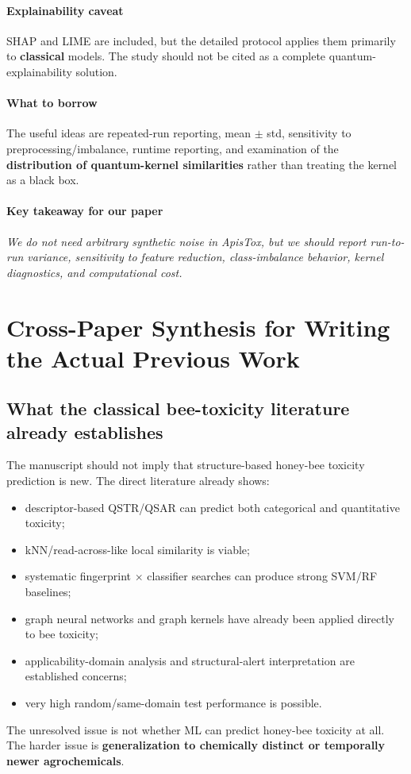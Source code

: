 \documentclass[11pt]{article}
\newcommand{\reviewfield}[2]{\paragraph{#1}#2}
\newcommand{\keytakeaway}[1]{\paragraph{Key takeaway for our paper}\emph{#1}}
\begin{document}
\reviewfield{Explainability caveat}{
SHAP and LIME are included, but the detailed protocol applies them primarily to \textbf{classical} models. The study should not be cited as a complete quantum-explainability solution.
}

\reviewfield{What to borrow}{
The useful ideas are repeated-run reporting, mean $\pm$ std, sensitivity to preprocessing/imbalance, runtime reporting, and examination of the \textbf{distribution of quantum-kernel similarities} rather than treating the kernel as a black box.
}

\keytakeaway{We do not need arbitrary synthetic noise in ApisTox, but we should report run-to-run variance, sensitivity to feature reduction, class-imbalance behavior, kernel diagnostics, and computational cost.}

\newpage
\section{Cross-Paper Synthesis for Writing the Actual Previous Work}

\subsection{What the classical bee-toxicity literature already establishes}

The manuscript should not imply that structure-based honey-bee toxicity prediction is new. The direct literature already shows:
\begin{itemize}
    \item descriptor-based QSTR/QSAR can predict both categorical and quantitative toxicity;
    \item kNN/read-across-like local similarity is viable;
    \item systematic fingerprint $\times$ classifier searches can produce strong SVM/RF baselines;
    \item graph neural networks and graph kernels have already been applied directly to bee toxicity;
    \item applicability-domain analysis and structural-alert interpretation are established concerns;
    \item very high random/same-domain test performance is possible.
\end{itemize}

The unresolved issue is not whether ML can predict honey-bee toxicity at all. The harder issue is \textbf{generalization to chemically distinct or temporally newer agrochemicals}.
\end{document}
